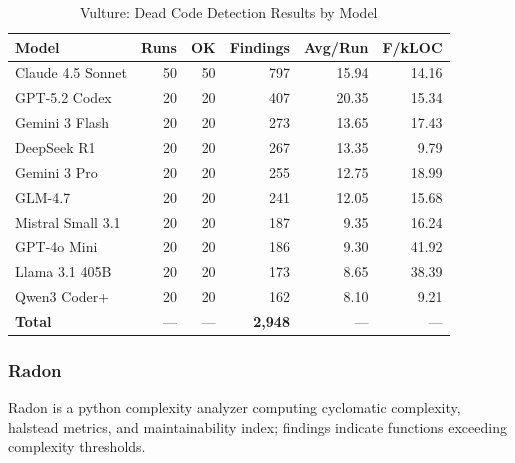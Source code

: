 \begin{table}[htbp]
    \centering
    \caption{Vulture: Dead Code Detection Results by Model}
    \label{tab:tool_vulture}
    \small
    \begin{tabular}{@{} l r r r r r @{}}
        \toprule
        \textbf{Model} & \textbf{Runs} & \textbf{OK} & \textbf{Findings} & \textbf{Avg/Run} & \textbf{F/kLOC} \\
        \midrule
        Claude 4.5 Sonnet & 50 & 50 & 797 & 15.94 & 14.16 \\
        GPT-5.2 Codex & 20 & 20 & 407 & 20.35 & 15.34 \\
        Gemini 3 Flash & 20 & 20 & 273 & 13.65 & 17.43 \\
        DeepSeek R1 & 20 & 20 & 267 & 13.35 & 9.79 \\
        Gemini 3 Pro & 20 & 20 & 255 & 12.75 & 18.99 \\
        GLM-4.7 & 20 & 20 & 241 & 12.05 & 15.68 \\
        Mistral Small 3.1 & 20 & 20 & 187 & 9.35 & 16.24 \\
        GPT-4o Mini & 20 & 20 & 186 & 9.30 & 41.92 \\
        Llama 3.1 405B & 20 & 20 & 173 & 8.65 & 38.39 \\
        Qwen3 Coder+ & 20 & 20 & 162 & 8.10 & 9.21 \\
        \midrule
        \textbf{Total} & --- & --- & \textbf{2{,}948} & --- & --- \\
        \bottomrule
    \end{tabular}
\end{table}

\subsubsection{Radon}

Radon is a python complexity analyzer computing cyclomatic complexity, halstead metrics, and maintainability index; findings indicate functions exceeding complexity thresholds.

